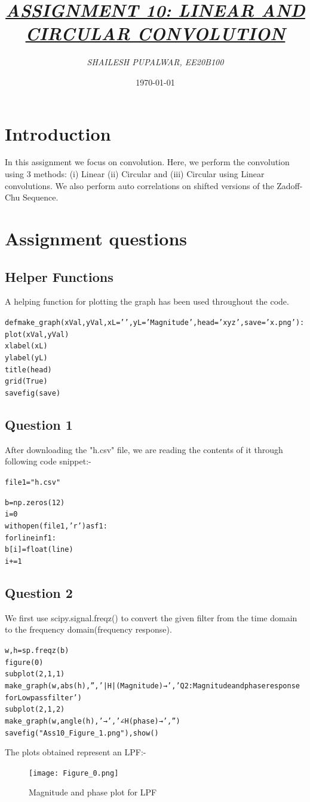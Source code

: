 \documentclass{article}
\title{\underline{\textit{\Large{ASSIGNMENT 10: LINEAR AND CIRCULAR CONVOLUTION}}}}
\author{\textit{ SHAILESH PUPALWAR, EE20B100 }}
\date{\today}
\begin{document}
\maketitle

\section{Introduction}
In this assignment we focus on convolution. Here, we perform the convolution using 3 methods:  (i) Linear (ii) Circular and (iii) Circular using Linear convolutions. We also perform auto correlations on shifted versions of the Zadoff-Chu Sequence.

\section{Assignment questions}

\subsection{Helper Functions}
A helping function for plotting the graph has been used throughout the code.
\lstset{language=Python}
\lstset{frame=lines}
\lstset{basicstyle=\footnotesize}
\begin{alltt}
def make_graph(xVal, yVal, xL = '\omega', yL = 'Magnitude', head = 'xyz', save = 'x.png'):
    plot(xVal, yVal)
    xlabel(xL)
    ylabel(yL)
    title(head)
    grid(True)
    savefig(save) 
\end{alltt}

\subsection{Question 1}
After downloading the "h.csv" file, we are reading the contents of it through following code snippet:- 
\begin{alltt}
file1 = "h.csv"

b = np.zeros(12)
i = 0
with open(file1, 'r') as f1:  
    for line in f1:
        b[i] = float(line) 
        i += 1
\end{alltt}
\subsection{Question 2}
We first use scipy.signal.freqz() to convert the given filter from the time domain to the frequency domain(frequency response). 
\begin{alltt}
w, h = sp.freqz(b)
figure(0)
subplot(2, 1, 1)
make_graph(w,abs(h),'','|H| (Magnitude) →', 'Q2: Magnitude and phase response 
for Low pass filter')
subplot(2, 1, 2)
make_graph(w, angle(h), '\omega →', '∠H (phase) →' , '')
savefig("Ass10_Figure_1.png"), show()
\end{alltt}
The plots obtained represent an LPF:-
\begin{figure}[h!]
\centering
\texttt{[image: Figure\_0.png]}
\caption{Magnitude and phase plot for LPF}
\label{fig:universe}
\end{figure}
\end{document}
